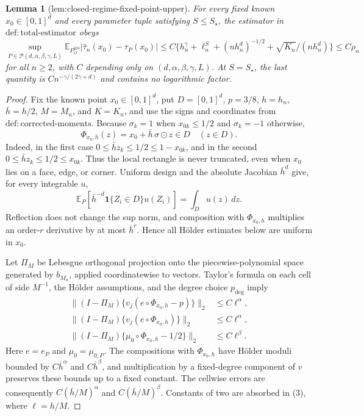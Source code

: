 \documentclass{article}
\newtheorem{lemma}{Lemma}
\begin{document}
\begin{lemma}[lem:closed-regime-fixed-point-upper]\label{lem:closed-regime-fixed-point-upper}
For every fixed known \(x_0\in[0,1]^d\) and every parameter tuple satisfying \(S\le S_\star\), the estimator in \(\mathrm{def:total\mbox{-}estimator}\) obeys
\[
\sup_{P\in\mathcal P(d,\alpha,\beta,\gamma,L)}
\mathbb E_{P_O^{\otimes n}}|\widehat\tau_n(x_0)-\tau_P(x_0)|
\le C\{h_n^\gamma+\ell_n^S+(nh_n^d)^{-1/2}+\sqrt{K_n}/(nh_n^d)\}
\le C\rho_n
\]
for all \(n\ge2\), with \(C\) depending only on \((d,\alpha,\beta,\gamma,L)\).  At \(S=S_\star\), the last quantity is \(Cn^{-\gamma/(2\gamma+d)}\) and contains no logarithmic factor.
\end{lemma}
\begin{proof}
Fix the known point \(x_0\in[0,1]^d\), put \(D=[0,1]^d\), \(p=3/8\), \(h=h_n\), \(\bar h=h/2\), \(M=M_n\), and \(K=K_n\), and use the signs and coordinates from \(\mathrm{def:corrected\mbox{-}moments}\).  Because \(\sigma_k=1\) when \(x_{0k}\le 1/2\) and \(\sigma_k=-1\) otherwise,
\[
 \Phi_{x_0,h}(z)=x_0+\bar h\,\sigma\odot z\in D
 \quad (z\in D).                                                    \tag{1}
\]
Indeed, in the first case \(0\le \bar h z_k\le1/2\le1-x_{0k}\), and in the second \(0\le\bar h z_k\le1/2\le x_{0k}\).  Thus the local rectangle is never truncated, even when \(x_0\) lies on a face, edge, or corner.  Uniform design and the absolute Jacobian \(\bar h^d\) give, for every integrable \(u\),
\[
 \mathbb E_P\!\left[\bar h^{-d}\mathbf1\{Z_i\in D\}u(Z_i)\right]
 =\int_Du(z)\,dz.                                                     \tag{2}
\]
Reflection does not change the sup norm, and composition with \(\Phi_{x_0,h}\) multiplies an order-\(r\) derivative by at most \(\bar h^r\).  Hence all H\"older estimates below are uniform in \(x_0\).

Let \(\Pi_M\) be Lebesgue orthogonal projection onto the piecewise-polynomial space generated by \(b_{M_n}\), applied coordinatewise to vectors.  Taylor's formula on each cell of side \(M^{-1}\), the H\"older assumptions, and the degree choice \(p_{\mathrm{deg}}\) imply
\[
\begin{aligned}
 \|(I-\Pi_M)\{v_j(e\circ\Phi_{x_0,h}-p)\}\|_2&\le C \ell^\alpha,\\
 \|(I-\Pi_M)\{v_j(e\circ\Phi_{x_0,h})\}\|_2&\le C \ell^\alpha,\\
 \|(I-\Pi_M)\{\mu_0\circ\Phi_{x_0,h}-1/2\}\|_2&\le C \ell^\beta. \tag{3}
\end{aligned}
\]
Here \(e=e_P\) and \(\mu_0=\mu_{0,P}\).  The compositions with \(\Phi_{x_0,h}\) have H\"older moduli bounded by \(C\bar h^\alpha\) and \(C\bar h^\beta\), and multiplication by a fixed-degree component of \(v\) preserves these bounds up to a fixed constant.  The cellwise errors are consequently \(C(\bar h/M)^\alpha\) and \(C(\bar h/M)^\beta\).  Constants of two are absorbed in (3), where \(\ell=h/M\).


\end{proof}
\end{document}
